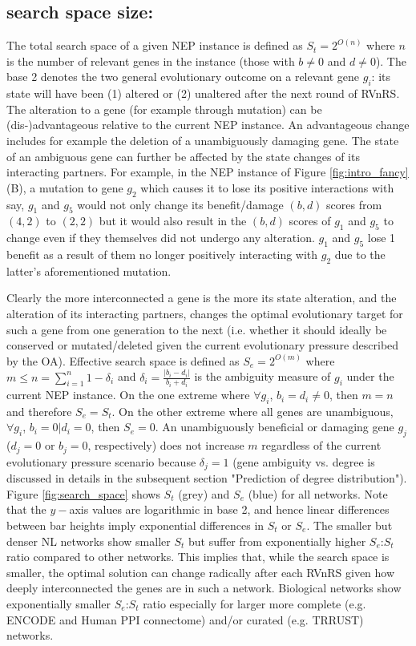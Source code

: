 	\subsection{search space size:}\label{sec:search_space}

			The total search space of a given NEP instance is defined as $S_t = 2^{O(n)}$ where $n$ is the number of relevant genes  in the instance (those with $b\neq 0$ and $d\neq 0$). The base 2 denotes the two general evolutionary outcome on a relevant gene $g_i$: its state will have been (1) altered or (2) unaltered after the next round of RVnRS. The alteration to a gene (for example through mutation) can be (dis-)advantageous relative to the current NEP instance. An advantageous change includes for example the deletion of a unambiguously damaging gene. The state of an ambiguous gene can further be affected by the state changes of its interacting partners. For example, in the NEP instance of Figure \ref{fig:intro_fancy} (B), a mutation to gene $g_2$ which causes it to lose its positive interactions with say,  $g_1$ and $g_5$ would not only change its benefit/damage $(b,d)$ scores from $(4,2)$ to $(2,2)$  but it would also result in the $(b,d)$ scores of $g_1$ and $g_5$ to change even if they themselves did not undergo any alteration. $g_1$ and $g_5$ lose 1 benefit as a result of them no longer positively interacting with  $g_2$ due to the  latter's aforementioned mutation.

			Clearly the more interconnected a gene is the more its state alteration, and the alteration of its interacting partners, changes the optimal evolutionary target for such a gene from one generation to the next (i.e. whether it should ideally be conserved or mutated/deleted given the current evolutionary pressure described by the OA). Effective search space is  defined as $S_e=2^{O(m)}$ where $m\leq n=\sum\limits_{i=1}^{n}{1-\delta_i}$ and  ${\delta}_i=\frac{|b_i-d_i|}{b_i+d_i}$ is the ambiguity measure of $g_i$ under the current NEP instance. On the one extreme where $\forall g_i$, $b_i=d_i\neq 0$, then $m=n$ and therefore $S_e=S_t$. On the other extreme where all genes are unambiguous, $\forall g_i$, $b_i=0|d_i=0$, then $S_e=0$.  An unambiguously beneficial or damaging gene $g_j$  ($d_j=0$ or $b_j=0$, respectively) does not increase $m$ regardless of the current evolutionary pressure scenario because $\delta_j = 1$   (gene ambiguity vs.  degree is discussed in details in the subsequent section "Prediction of degree distribution"). Figure \ref{fig:search_space} shows $S_t$ (grey) and $S_e$ (blue) for all networks. Note that the $y-$axis values are logarithmic in base 2, and hence linear differences between bar heights imply exponential differences in $S_t$ or $S_e$. The smaller but denser NL networks show smaller $S_t$ but suffer from exponentially higher $S_e$:$S_t$ ratio compared to other networks. This implies that, while the search space is smaller, the optimal solution can change radically after each RVnRS given how deeply interconnected the genes are in such a network. Biological networks show exponentially smaller $S_e$:$S_t$ ratio especially for larger more complete  (e.g. ENCODE and Human  PPI connectome) and/or curated (e.g. TRRUST) networks.
